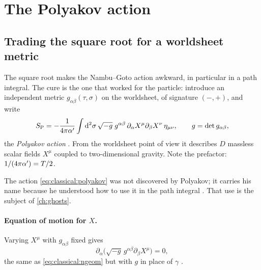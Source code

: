 \section{The Polyakov action}\label{sec:classical:polyakov}

\subsection{Trading the square root for a worldsheet metric}

The square root makes the Nambu--Goto action awkward, in particular in a path integral. The
cure is the one that worked for the particle: introduce an independent metric
$g_{\alpha\beta}(\tau,\sigma)$ on the worldsheet, of signature $(-,+)$, and write
\begin{equation}\label{eq:classical:polyakov}
  S_{\rm P}=-\frac{1}{4\pi\alpha'}\int\mathrm{d}^2\sigma\,\sqrt{-g}\;g^{\alpha\beta}\,
  \partial_\alpha X^\mu\partial_\beta X^\nu\,\eta_{\mu\nu},\qquad g=\det g_{\alpha\beta},
\end{equation}
the \emph{Polyakov action} . From
the worldsheet point of view it describes $D$ massless scalar fields $X^\mu$ coupled to
two-dimensional gravity. Note the prefactor: $1/(4\pi\alpha')=T/2$.

\begin{historybox}
The action \eqref{eq:classical:polyakov} was not discovered by Polyakov; it carries his name
because he understood how to use it in the path integral
. That use is the subject of \cref{ch:ghosts}.
\end{historybox}

\paragraph{Equation of motion for $X$.} Varying $X^\mu$ with $g_{\alpha\beta}$ fixed gives
\begin{equation}\label{eq:classical:poly-eomX}
  \partial_\alpha\big(\sqrt{-g}\,g^{\alpha\beta}\partial_\beta X^\mu\big)=0,
\end{equation}
the same as \eqref{eq:classical:ngeom} but with $g$ in place of $\gamma$
.

